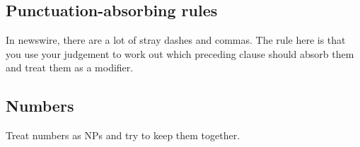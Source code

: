 \documentclass[a4paper]{article}
\begin{document}
\subsection{Punctuation-absorbing rules}

In newswire, there are a lot of stray dashes and commas.
The rule here is that you use your judgement to work out which preceding clause should absorb them and treat them as a modifier.

\subsection{Numbers}

Treat numbers as NPs and try to keep them together.
\end{document}

